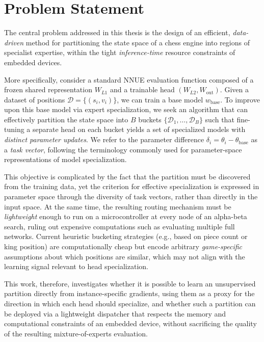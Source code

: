 \section{Problem Statement}\label{sec:problem-statement}

The central problem addressed in this thesis is the design of an efficient, \emph{data-driven} method for partitioning the state space of a chess engine into regions of specialist expertise, within the tight \emph{inference-time} resource constraints of embedded devices.

More specifically, consider a standard NNUE evaluation function composed of a frozen shared representation \(W_{L1}\) and a trainable head \((W_{L2}, W_{\mathrm{out}})\). Given a dataset of positions \(\mathcal{D} = \{(s_i, v_i)\}\), we can train a base model \(w_{\mathrm{base}}\). To improve upon this base model via expert specialization, we seek an algorithm that can effectively partition the state space into \(B\) buckets \(\{\mathcal{D}_1, \dots, \mathcal{D}_B\}\) such that fine-tuning a separate head on each bucket yields a set of specialized models with \emph{distinct parameter updates}. We refer to the parameter difference \(\delta_i = \theta_i-\theta_{\mathrm{base}}\) as a \emph{task vector}, following the terminology commonly used for parameter-space representations of model specialization.

This objective is complicated by the fact that the partition must be discovered from the training data, yet the criterion for effective specialization is expressed in parameter space through the diversity of task vectors, rather than directly in the input space. At the same time, the resulting routing mechanism must be \emph{lightweight} enough to run on a microcontroller at every node of an alpha-beta search, ruling out expensive computations such as evaluating multiple full networks. Current heuristic bucketing strategies (e.g., based on piece count or king position) are computationally cheap but encode arbitrary \emph{game-specific} assumptions about which positions are similar, which may not align with the learning signal relevant to head specialization.

This work, therefore, investigates whether it is possible to learn an unsupervised partition directly from instance-specific gradients, using them as a proxy for the direction in which each head should specialize, and whether such a partition can be deployed via a lightweight dispatcher that respects the memory and computational constraints of an embedded device, without sacrificing the quality of the resulting mixture-of-experts evaluation.

